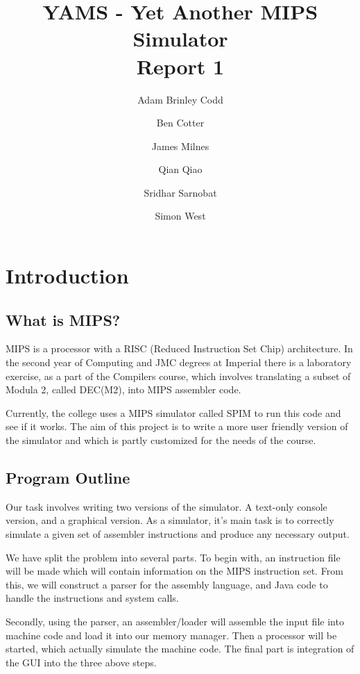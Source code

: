 \documentclass[12pt]{report}
\begin{document}
\title{YAMS - Yet Another MIPS Simulator
\\Report 1}
\author{Adam Brinley Codd
\and
Ben Cotter
\and
James Milnes
\and
Qian Qiao
\and
Sridhar Sarnobat
\and
Simon West}
\maketitle



\tableofcontents
\thispagestyle{empty}



\chapter{Introduction}

\section{What is MIPS?}

MIPS is a processor with a RISC (Reduced Instruction Set Chip) architecture. In the second year of Computing and JMC degrees at Imperial there is a laboratory exercise, as a part of the Compilers course, which involves translating a subset of Modula 2, called DEC(M2), into MIPS assembler code.

Currently, the college uses a MIPS simulator called SPIM to run this code and see if it works.  The aim of this project is to write a more user friendly version of the simulator and which is partly customized for the needs of the course.


\section{Program Outline}

Our task involves writing two versions of the simulator.  A text-only console version, and a graphical version. As a simulator, it's main task is to correctly simulate a given set of assembler instructions and produce any necessary output.

We have split the problem into several parts. To begin with, an instruction file will be made which will contain information on the MIPS instruction set.  From this, we will construct a parser for the assembly language, and Java code to handle the instructions and system calls.

Secondly, using the parser, an assembler/loader will assemble the input file into machine code and load it into our memory manager. Then a processor will be started, which actually simulate the machine code. The final part is integration of the GUI into the three above steps.
\end{document}
